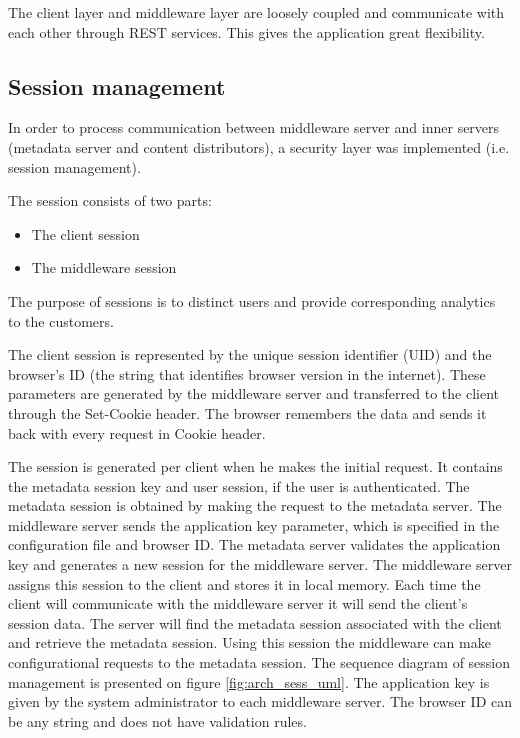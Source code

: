 The client layer and middleware layer are loosely coupled and communicate with each other through REST services. This gives the application great flexibility.


\subsection{Session management}

In order to process communication between middleware server and inner servers (metadata server and content distributors), a security layer was implemented (i.e. session management).

The session consists of two parts: 

\begin{itemize}
	\item The client session
	\item The middleware session
\end{itemize}

The purpose of sessions is to distinct users and provide corresponding analytics to the customers.

The client session is represented by the unique session identifier (UID) and the browser's ID (the string that identifies browser version in the internet). These parameters are generated by the middleware server and transferred to the client through the Set-Cookie header. The browser remembers the data and sends it back with every request in Cookie header.

The session is generated per client when he makes the initial request. It contains the metadata session key and user session, if the user is authenticated. The metadata session is obtained by making the request to the metadata server. The middleware server sends the application key parameter, which is specified in the configuration file and browser ID. The metadata server validates the application key and generates a new session for the middleware server. The middleware server assigns this session to the client and stores it in local memory. Each time the client will communicate with the middleware server it will send the client's session data. The server will find the metadata session associated with the client and retrieve the metadata session. Using this session the middleware can make configurational requests to the metadata session. The sequence diagram of session management is presented on figure \ref{fig:arch_sess_uml}. The application key is given by the system administrator to each middleware server. The browser ID can be any string and does not have validation rules.



